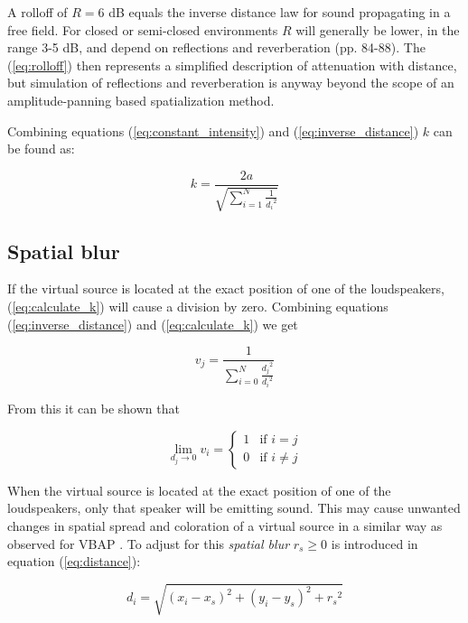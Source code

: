 \documentclass[twoside,10pt]{article}
\begin{document}
A rolloff of $R = 6$ dB equals the inverse distance law for sound propagating in a free field. For closed or semi-closed environments $R$ will generally be lower, in the range 3-5 dB, and depend on reflections and reverberation \cite{Everest:2000handbook_acoustics} (pp. 84-88). The (\ref{eq:rolloff}) then represents a simplified description of attenuation with distance, but simulation of reflections and reverberation is anyway beyond the scope of an amplitude-panning based spatialization method.

Combining equations (\ref{eq:constant_intensity}) and (\ref{eq:inverse_distance}) $k$ can be found as:

\begin{equation} \label{eq:calculate_k}
k = \frac{2a}{\sqrt{\sum_{i=1}^{N} \frac{1}{{d_{i}}^2}}}
\end{equation}




\subsection{Spatial blur}

If the virtual source is located at the exact position of one of the loudspeakers, (\ref{eq:calculate_k}) will cause a division by zero. Combining equations (\ref{eq:inverse_distance}) and (\ref{eq:calculate_k}) we get

\begin{equation}
v_{j} = \frac{1}{\sum_{i=0}^{N} \frac{{d_{j}}^2}{{d_{i}}^2}}
\end{equation}

From this it can be shown that

\begin{equation} \label{eq:distance_zero}
\lim_{d_{j} \rightarrow 0} v_{i} = 
\left\{ \begin{array}{ll} 
1 & \textrm{if $i=j$}\\ 
0 & \textrm{if $i \ne j$}
\end{array} \right.
\end{equation}

When the virtual source is located at the exact position of one of the loudspeakers, only that speaker will be emitting sound. This may cause unwanted changes in spatial spread and coloration of a virtual source in a similar way as observed for VBAP \cite{Pulkki:1999vbap}. To adjust for this \textit{spatial blur} $r_{s} \ge 0$ is introduced in equation (\ref{eq:distance}):

\begin{equation} \label{eq:mod_distance}
d_{i} = \sqrt{ {(x_{i} - x_{s})}^2 + {(y_{i} - y_{s})}^2 + {r_{s}}^2}
\end{equation}
\end{document}
